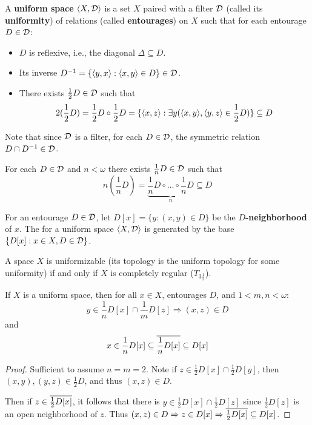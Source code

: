 



\begin{definition}
  A \textbf{uniform space} $\langle X,\mathcal{D}\rangle$ is a set $X$ paired with a filter $\mathcal{D}$ (called its \textbf{uniformity}) of relations (called \textbf{entourages}) on $X$ such that for each entourage $D\in \mathcal{D}$:
    \begin{itemize}
      \item $D$ is reflexive, i.e., the diagonal $\Delta\subseteq D$.
      \item Its inverse $D^{-1}=\{\langle y,x\rangle:\langle x,y\rangle\in D\}\in \mathcal{D}$.
      \item There exists $\frac{1}{2}D\in\mathcal{D}$ such that 
        \[
          2(\frac{1}{2}D)=\frac{1}{2}D\circ\frac{1}{2}D=\{\langle x,z\rangle:\exists y(\langle x,y\rangle,\langle y,z\rangle\in\frac{1}{2}D)\}\subseteq D
        \]
    \end{itemize}
  Note that since $\mathcal{D}$ is a filter, for each $D\in\mathcal{D}$, the symmetric relation $D\cap D^{-1}\in \mathcal{D}$.
\end{definition}

\begin{proposition}
For each $D\in\mathcal{D}$ and $n<\omega$ there exists $\frac{1}{n}D\in\mathcal{D}$ such that 
  \[n(\frac{1}{n}D)=\underbrace{\frac{1}{n}D\circ\dots\circ\frac{1}{n}D}_{n}\subseteq D\]
\end{proposition}

\begin{definition}
  For an entourage $D\in\mathcal{D}$, let $D[x]=\{y:(x,y)\in D\}$ be the \textbf{$D$-neighborhood} of $x$. The  for a uniform space $\langle X,\mathcal{D}\rangle$ is generated by the base $\{D[x]:x\in X,D\in\mathcal{D}\}$.
\end{definition}

\begin{theorem}
  A space $X$ is uniformizable (its topology is the uniform topology for some uniformity) if and only if $X$ is completely regular ($T_{3\frac{1}{2}}$).
\end{theorem}

\begin{proposition}
  If $X$ is a uniform space, then for all $x\in X$, entourages $D$, and $1<m,n<\omega$:
    \[
      y\in \frac{1}{n}D[x]\cap\frac{1}{m}D[z] \Rightarrow (x,z)\in D
    \]
  and
    \[
      x\in \frac{1}{n}D[x]\subseteq \overline{\frac{1}{n}D[x]}\subseteq D[x]
    \]
\end{proposition}

\begin{proof}
  Sufficient to assume $n=m=2$. Note if $z\in \frac{1}{2}D[x]\cap\frac{1}{2}D[y]$, then $(x,y),(y,z)\in \frac{1}{2}D$, and thus $(x,z)\in D$.

  Then if $z\in \overline{\frac{1}{2}D[x]}$, it follows that there is $y\in \frac{1}{2}D[x]\cap\frac{1}{2}D[z]$ since $\frac{1}{2}D[z]$ is an open neighborhood of $z$. Thus $(x,z)\in D \Rightarrow z\in D[x] \Rightarrow \overline{\frac{1}{2}D[x]}\subseteq D[x]$.
\end{proof}

